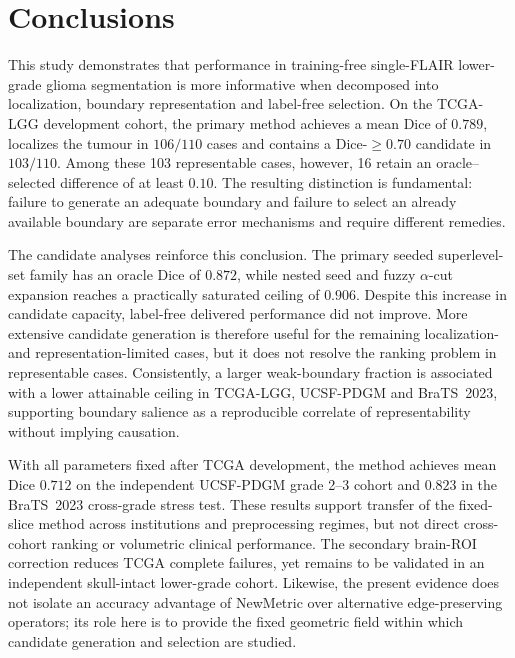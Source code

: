 \documentclass[11pt,a4paper]{article}
\begin{document}
\fi

\section{Conclusions}

\label{sec:conclusion}

This study demonstrates that performance in training-free single-FLAIR
lower-grade glioma segmentation is more informative when decomposed into
localization, boundary representation and label-free selection. On the TCGA-LGG
development cohort, the primary method achieves a mean Dice of $0.789$, localizes
the tumour in $106/110$ cases and contains a Dice-$\ge0.70$ candidate in
$103/110$. Among these 103 representable cases, however, 16 retain an
oracle--selected difference of at least $0.10$. The resulting distinction is
fundamental: failure to generate an adequate boundary and failure to select an
already available boundary are separate error mechanisms and require different
remedies.

The candidate analyses reinforce this conclusion. The primary seeded
superlevel-set family has an oracle Dice of $0.872$, while nested seed and fuzzy
$\alpha$-cut expansion reaches a practically saturated ceiling of $0.906$.
Despite this increase in candidate capacity, label-free delivered performance did
not improve. More extensive candidate generation is therefore useful for the
remaining localization- and representation-limited cases, but it does not resolve
the ranking problem in representable cases. Consistently, a larger weak-boundary
fraction is associated with a lower attainable ceiling in TCGA-LGG,
UCSF-PDGM and BraTS~2023, supporting boundary salience as a reproducible correlate
of representability without implying causation.

With all parameters fixed after TCGA development, the method achieves mean Dice
$0.712$ on the independent UCSF-PDGM grade 2--3 cohort and $0.823$ in the
BraTS~2023 cross-grade stress test. These results support transfer of the
fixed-slice method across institutions and preprocessing regimes, but not direct
cross-cohort ranking or volumetric clinical performance. The secondary
brain-ROI correction reduces TCGA complete failures, yet remains to be validated
in an independent skull-intact lower-grade cohort. Likewise, the present evidence
does not isolate an accuracy advantage of NewMetric over alternative
edge-preserving operators; its role here is to provide the fixed geometric field
within which candidate generation and selection are studied.
\end{document}
